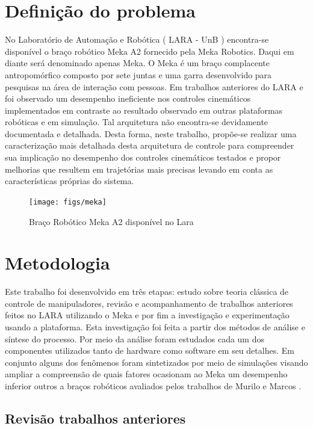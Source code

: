 \section{Definição do problema}

No Laboratório de Automação e Robótica ( LARA - UnB ) encontra-se disponível o braço robótico Meka A2 fornecido pela Meka Robotics. Daqui em diante será denominado apenas Meka. O Meka é um braço complacente antropomórfico composto por sete juntas e uma garra desenvolvido para pesquisas na área de interação com pessoas. Em trabalhos anteriores do LARA \cite{marcosps2016} e \cite{koji2017} foi observado um desempenho ineficiente nos controles cinemáticos implementados em contraste ao resultado observado em outras plataformas robóticas e em simulação. Tal arquitetura não encontra-se devidamente documentada e detalhada. Desta forma, neste trabalho, propõe-se realizar uma caracterização mais detalhada desta arquitetura de controle para compreender sua implicação no desempenho dos controles cinemáticos testados e propor melhorias que resultem em trajetórias mais precisas levando em conta as características próprias do sistema.

\begin{figure}[H]
    \centering
    \texttt{[image: figs/meka]}
    \caption{Braço Robótico Meka A2 disponível no Lara \cite{marcosps2016}}
    \label{fig:meka_arm}
\end{figure}

\section{Metodologia}

Este trabalho foi desenvolvido em três etapas: estudo sobre teoria clássica de controle de manipuladores, revisão e acompanhamento de trabalhos anteriores feitos no LARA utilizando o Meka e por fim a investigação e experimentação usando a plataforma. Esta investigação foi feita a partir dos métodos de análise e síntese do processo. Por meio da análise foram estudados cada um dos componentes utilizados tanto de hardware como software em seu detalhes. Em conjunto alguns dos fenômenos foram sintetizados por meio de simulações visando ampliar a compreensão de quais fatores ocasionam ao Meka um desempenho inferior outros a braços robóticos avaliados pelos trabalhos de Murilo \cite{murlow2014} e Marcos \cite{marcosps2016}.

\subsection{Revisão trabalhos anteriores}

